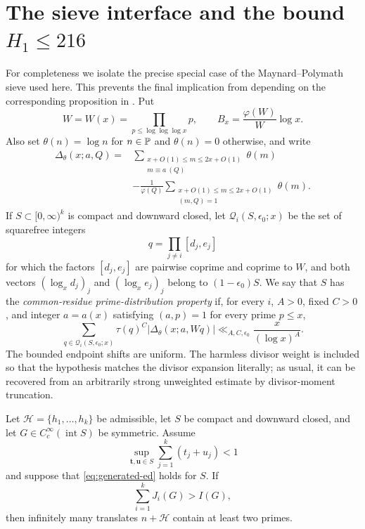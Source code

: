 \section{The sieve interface and the bound
\texorpdfstring{$H_1\le216$}{H1 <= 216}}
\label{sec:main-proof}

For completeness we isolate the precise special case of the
Maynard--Polymath sieve used here.  This prevents the final implication from
depending on the corresponding proposition in \cite{Stadlmann2026}.  Put
\[
 W=W(x)=\prod_{p\le\log\log\log x}p,
 \qquad B_x=\frac{\varphi(W)}W\log x.
\]
Also set $\theta(n)=\log n$ for $n\in\mathbb P$ and $\theta(n)=0$ otherwise, and
write
\begin{align*}
 \Delta_\theta(x;a,Q)
 ={}&\sum_{\substack{x+O(1)\le m\le2x+O(1)\\m\equiv a\ (Q)}}\theta(m)\\
 &-\frac1{\varphi(Q)}
 \sum_{\substack{x+O(1)\le m\le2x+O(1)\\(m,Q)=1}}\theta(m).
\end{align*}
If $S\subset[0,\infty)^k$ is compact and downward closed, let
$\mathcal Q_i(S,\epsilon_0;x)$ be the set of squarefree integers
\[
 q=\prod_{j\ne i}[d_j,e_j]
\]
for which the factors $[d_j,e_j]$ are pairwise coprime and coprime to $W$, and
both vectors $(\log_xd_j)_j$ and $(\log_xe_j)_j$ belong to
$(1-\epsilon_0)S$.  We say that $S$ has the \emph{common-residue
prime-distribution property} if, for every $i$, $A>0$, fixed $C>0$, and
integer $a=a(x)$ satisfying $(a,p)=1$ for every prime $p\le x$,
\begin{equation}\label{eq:generated-ed}
 \sum_{q\in\mathcal Q_i(S,\epsilon_0;x)}\tau(q)^C
 \left|\Delta_\theta(x;a,Wq)\right|
 \ll_{A,C,\epsilon_0}\frac{x}{(\log x)^A}.
\end{equation}
The bounded endpoint shifts are uniform.  The harmless divisor weight is
included so that the hypothesis matches the divisor expansion literally;
as usual, it can be recovered from an arbitrarily strong unweighted estimate
by divisor-moment truncation.

\begin{proposition}\label{prop:sieve-transfer}
Let $\mathcal H=\{h_1,\ldots,h_k\}$ be admissible, let $S$ be compact and
downward closed, and let $G\in C_c^\infty(\operatorname{int}S)$ be symmetric.
Assume
\begin{equation}\label{eq:mass-support}
 \sup_{\mathbf t,\mathbf u\in S}
 \sum_{j=1}^k(t_j+u_j)<1
\end{equation}
and suppose that \cref{eq:generated-ed} holds for $S$.  If
\begin{equation}\label{eq:sieve-criterion}
 \sum_{i=1}^kJ_i(G)>I(G),
\end{equation}
then infinitely many translates $n+\mathcal H$ contain at least two primes.
\end{proposition}

